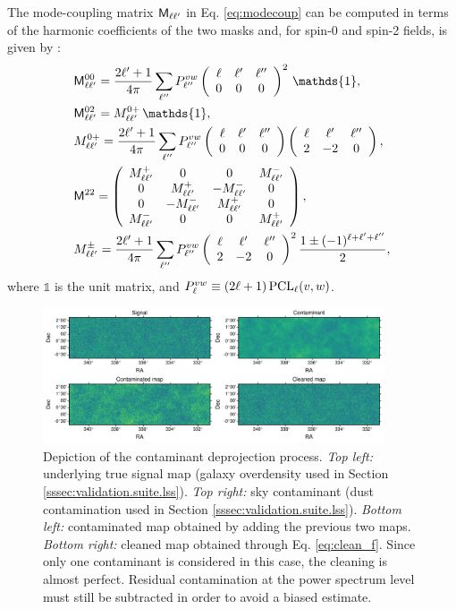 \documentclass[usenatbib]{mnrasb}
\newcommand{\wtj}[6]{\left(\begin{array}{ccc} #1 & #2 & #3\\#4 & #5 & #6\end{array} \right)}
\newcommand{\mI}{{\mathds{1}}}
\begin{document}
        The mode-coupling matrix ${\sf M}_{\ell\ell'}$ in Eq. \ref{eq:modecoup} can be computed in terms of the harmonic coefficients of the two masks and, for spin-0 and spin-2 fields, is given by \citep{2002ApJ...567....2H,2003ApJS..148..161K}:
        \begin{align}\label{eq:m00}
          &{\sf M}^{00}_{\ell\ell'}=\frac{2\ell'+1}{4\pi}\sum_{\ell''}P^{vw}_{\ell''}\wtj{\ell}{\ell'}{\ell''}{0}{0}{0}^2\,\mI,\\\label{eq:m02}
          &{\sf M}^{02}_{\ell\ell'}=M^{0+}_{\ell\ell'}\,\mI,\\\nonumber
          &M^{0+}_{\ell\ell'}=\frac{2\ell'+1}{4\pi}\sum_{\ell''}P^{vw}_{\ell''}\wtj{\ell}{\ell'}{\ell''}{0}{0}{0}\wtj{\ell}{\ell'}{\ell''}{2}{-2}{0},\\\label{eq:m22}
          &{\sf M}^{22}=\left(
                        \begin{array}{cccc}
                          M^{+}_{\ell\ell'} & 0 & 0 & M^{-}_{\ell\ell'} \\
                          0 & M^{+}_{\ell\ell'} & -M^{-}_{\ell\ell'} & 0 \\
                          0 & -M^{-}_{\ell\ell'} & M^{+}_{\ell\ell'} & 0 \\
                          M^{-}_{\ell\ell'} & 0 & 0 & M^{+}_{\ell\ell'}
                        \end{array}\right),\\\nonumber
          &M^{\pm}_{\ell\ell'}=\frac{2\ell'+1}{4\pi}\sum_{\ell''}P^{vw}_{\ell''}\wtj{\ell}{\ell'}{\ell''}{2}{-2}{0}^2\frac{1\pm(-1)^{\ell+\ell'+\ell''}}{2},
        \end{align}
        where $\mI$ is the unit matrix, and $P^{vw}_\ell\equiv(2\ell+1)\,{\rm PCL}_\ell(v,w)$.
        \begin{figure}
          \centering
          \includegraphics[width=0.9\textwidth]{maps_contamination}
          \caption{Depiction of the contaminant deprojection process. {\sl Top left:} underlying true signal map (galaxy overdensity used in Section \ref{sssec:validation.suite.lss}). {\sl Top right:} sky contaminant (dust contamination used in Section \ref{sssec:validation.suite.lss}). {\sl Bottom left:} contaminated map obtained by adding the previous two maps. {\sl Bottom right:} cleaned map obtained through Eq. \ref{eq:clean_f}. Since only one contaminant is considered in this case, the cleaning is almost perfect. Residual contamination at the power spectrum level must still be subtracted in order to avoid a biased estimate.}
          \label{fig:lss_cont}
        \end{figure}
      
\end{document}
